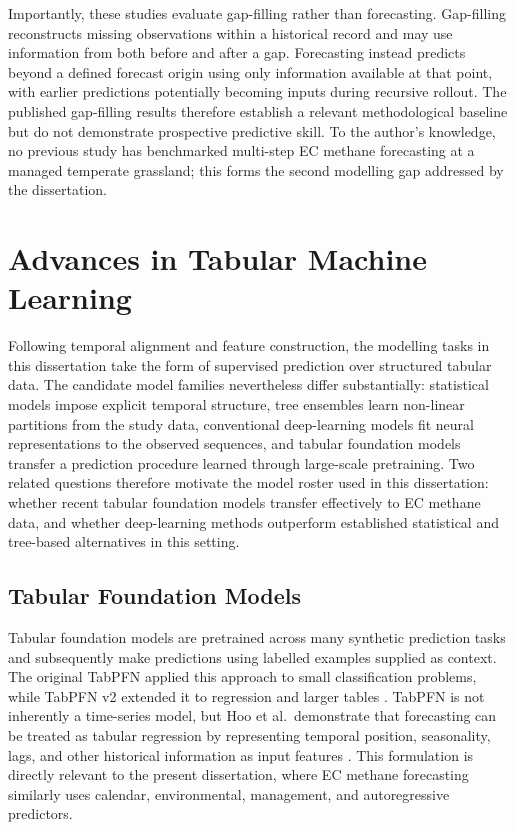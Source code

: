 Importantly, these studies evaluate gap-filling rather than forecasting.
Gap-filling reconstructs missing observations within a historical record and
may use information from both before and after a gap. Forecasting instead
predicts beyond a defined forecast origin using only information available at
that point, with earlier predictions potentially becoming inputs during
recursive rollout. The published gap-filling results therefore establish a
relevant methodological baseline but do not demonstrate prospective predictive
skill. To the author's knowledge, no previous study has benchmarked multi-step
EC methane forecasting at a managed temperate grassland; this forms the second
modelling gap addressed by the dissertation.

\section{Advances in Tabular Machine Learning}
\label{sec:tabular-modelling}

Following temporal alignment and feature construction, the modelling tasks in
this dissertation take the form of supervised prediction over structured
tabular data. The candidate model families nevertheless differ substantially:
statistical models impose explicit temporal structure, tree ensembles learn
non-linear partitions from the study data, conventional deep-learning models
fit neural representations to the observed sequences, and tabular foundation
models transfer a prediction procedure learned through large-scale
pretraining. Two related questions therefore motivate the model roster used in
this dissertation: whether recent tabular foundation models transfer
effectively to EC methane data, and whether deep-learning methods outperform
established statistical and tree-based alternatives in this setting.

\subsection{Tabular Foundation Models}

Tabular foundation models are pretrained across many synthetic prediction tasks
and subsequently make predictions using labelled examples supplied as context.
The original TabPFN applied this approach to small classification problems,
while TabPFN v2 extended it to regression and larger tables
\cite{hollmann2023tabpfn,hollmann2025tabpfn}. TabPFN is not inherently a
time-series model, but Hoo et al.\ demonstrate that forecasting can be treated
as tabular regression by representing temporal position, seasonality, lags, and
other historical information as input features \cite{hoo2026tabpfnts}. This
formulation is directly relevant to the present dissertation, where EC methane
forecasting similarly uses calendar, environmental, management, and
autoregressive predictors.

